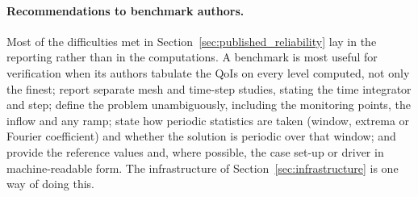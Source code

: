 \paragraph{Recommendations to benchmark authors.}
Most of the difficulties met in Section~\ref{sec:published_reliability} lay in the reporting rather than in the computations.
A benchmark is most useful for verification when its authors tabulate the QoIs on every level computed, not only the finest; report separate mesh and time-step studies, stating the time integrator and step; define the problem unambiguously, including the monitoring points, the inflow and any ramp; state how periodic statistics are taken (window, extrema or Fourier coefficient) and whether the solution is periodic over that window; and provide the reference values and, where possible, the case set-up or driver in machine-readable form.
The infrastructure of Section~\ref{sec:infrastructure} is one way of doing this.
